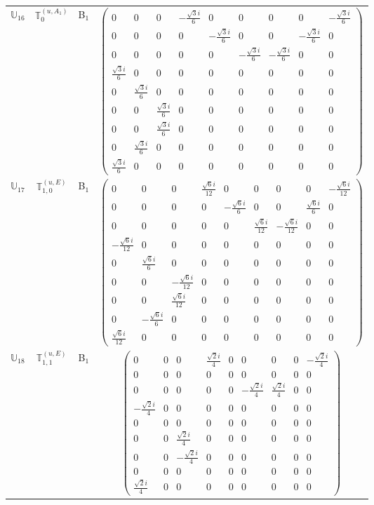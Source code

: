 \documentclass[fleqn,10pt,landscape]{article}
\begin{document}
\begin{itemize}
\begin{center}
\begin{longtable}{c|c|c|c}
$ \mathbb{U}_{16} $ & $\mathbb{T}_{0}^{(u,A_{1})}$ & B$_{1}$ & $\begin{pmatrix} 0 & 0 & 0 & - \frac{\sqrt{3} i}{6} & 0 & 0 & 0 & 0 & - \frac{\sqrt{3} i}{6} \\ 0 & 0 & 0 & 0 & - \frac{\sqrt{3} i}{6} & 0 & 0 & - \frac{\sqrt{3} i}{6} & 0 \\ 0 & 0 & 0 & 0 & 0 & - \frac{\sqrt{3} i}{6} & - \frac{\sqrt{3} i}{6} & 0 & 0 \\ \frac{\sqrt{3} i}{6} & 0 & 0 & 0 & 0 & 0 & 0 & 0 & 0 \\ 0 & \frac{\sqrt{3} i}{6} & 0 & 0 & 0 & 0 & 0 & 0 & 0 \\ 0 & 0 & \frac{\sqrt{3} i}{6} & 0 & 0 & 0 & 0 & 0 & 0 \\ 0 & 0 & \frac{\sqrt{3} i}{6} & 0 & 0 & 0 & 0 & 0 & 0 \\ 0 & \frac{\sqrt{3} i}{6} & 0 & 0 & 0 & 0 & 0 & 0 & 0 \\ \frac{\sqrt{3} i}{6} & 0 & 0 & 0 & 0 & 0 & 0 & 0 & 0 \end{pmatrix}$ \\
$ \mathbb{U}_{17} $ & $\mathbb{T}_{1,0}^{(u,E)}$ & B$_{1}$ & $\begin{pmatrix} 0 & 0 & 0 & \frac{\sqrt{6} i}{12} & 0 & 0 & 0 & 0 & - \frac{\sqrt{6} i}{12} \\ 0 & 0 & 0 & 0 & - \frac{\sqrt{6} i}{6} & 0 & 0 & \frac{\sqrt{6} i}{6} & 0 \\ 0 & 0 & 0 & 0 & 0 & \frac{\sqrt{6} i}{12} & - \frac{\sqrt{6} i}{12} & 0 & 0 \\ - \frac{\sqrt{6} i}{12} & 0 & 0 & 0 & 0 & 0 & 0 & 0 & 0 \\ 0 & \frac{\sqrt{6} i}{6} & 0 & 0 & 0 & 0 & 0 & 0 & 0 \\ 0 & 0 & - \frac{\sqrt{6} i}{12} & 0 & 0 & 0 & 0 & 0 & 0 \\ 0 & 0 & \frac{\sqrt{6} i}{12} & 0 & 0 & 0 & 0 & 0 & 0 \\ 0 & - \frac{\sqrt{6} i}{6} & 0 & 0 & 0 & 0 & 0 & 0 & 0 \\ \frac{\sqrt{6} i}{12} & 0 & 0 & 0 & 0 & 0 & 0 & 0 & 0 \end{pmatrix}$ \\
$ \mathbb{U}_{18} $ & $\mathbb{T}_{1,1}^{(u,E)}$ & B$_{1}$ & $\begin{pmatrix} 0 & 0 & 0 & \frac{\sqrt{2} i}{4} & 0 & 0 & 0 & 0 & - \frac{\sqrt{2} i}{4} \\ 0 & 0 & 0 & 0 & 0 & 0 & 0 & 0 & 0 \\ 0 & 0 & 0 & 0 & 0 & - \frac{\sqrt{2} i}{4} & \frac{\sqrt{2} i}{4} & 0 & 0 \\ - \frac{\sqrt{2} i}{4} & 0 & 0 & 0 & 0 & 0 & 0 & 0 & 0 \\ 0 & 0 & 0 & 0 & 0 & 0 & 0 & 0 & 0 \\ 0 & 0 & \frac{\sqrt{2} i}{4} & 0 & 0 & 0 & 0 & 0 & 0 \\ 0 & 0 & - \frac{\sqrt{2} i}{4} & 0 & 0 & 0 & 0 & 0 & 0 \\ 0 & 0 & 0 & 0 & 0 & 0 & 0 & 0 & 0 \\ \frac{\sqrt{2} i}{4} & 0 & 0 & 0 & 0 & 0 & 0 & 0 & 0 \end{pmatrix}$ \\

\end{longtable}
\end{center}
\end{itemize}
\end{document}
